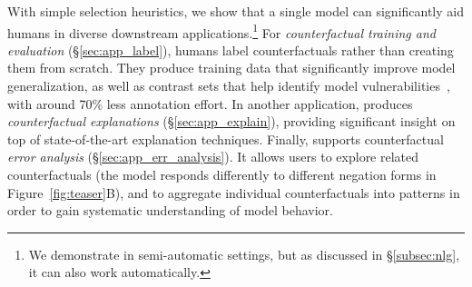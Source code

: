 
With simple selection heuristics, we show that a single \sysname model can significantly aid humans in diverse downstream applications.\footnote{We demonstrate \sysname in semi-automatic settings, but as discussed in \S\ref{subsec:nlg}, it can also work automatically.} 
For \emph{counterfactual training and evaluation} (\S\ref{sec:app_label}), humans label \sysname counterfactuals rather than creating them from scratch.
They produce training data that significantly improve model generalization, as well as contrast sets that help identify model vulnerabilities~\cite{gardner2020contrast}, with around 70\% less annotation effort. 
In another application, \sysname produces \emph{counterfactual explanations} (\S\ref{sec:app_explain}), providing significant insight on top of state-of-the-art explanation techniques. 
Finally, \sysname supports counterfactual \emph{error analysis} (\S\ref{sec:app_err_analysis}).
It allows users to explore related counterfactuals (\eg the model responds differently to different negation forms in Figure~\ref{fig:teaser}B), and to aggregate individual counterfactuals into patterns in order to gain systematic understanding of model behavior. 



